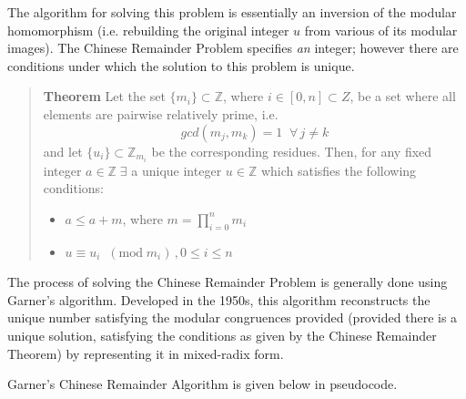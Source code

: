 \documentclass[letterpaper,12pt,titlepage,oneside,final]{book}
\newenvironment{theorem}{\begin{quote}%
  \textbf{Theorem }%
  \quad
}{%
\end{quote}%
}
\begin{document}
The algorithm for solving this problem is essentially an inversion of the modular homomorphism (i.e. rebuilding the original integer ${u}$ from various of its modular images).  The Chinese Remainder Problem specifies \textit{an} integer; however there are conditions under which the solution to this problem is unique.   
\newpage
\begin{theorem}\label{Chinese Remainder Theorem}
  Let the set ${\{m_i\} \subset \mathbb{Z}}$, where ${i \in [0, n] \subset Z}$, be a set where all elements are pairwise relatively prime, i.e.
  \begin{equation*}
    gcd( m_j, m_k) = 1 \;\; \forall \, j \neq k
  \end{equation*}
  and let ${\{u_i\} \subset \mathbb{Z}_{m_i}}$ be the corresponding residues.  Then, for any fixed integer ${a \in \mathbb{Z} \; \exists}$ a unique integer ${u \in \mathbb{Z}}$ which satisfies the following conditions:
  \begin{itemize}
    \item ${a \leq a + m}$, where ${m = \prod_{i=0}^{n}m_i}$
    \item ${u \equiv u_i \;\; (\textrm{mod} \; m_i)\,, 0 \leq i \leq n}$
  \end{itemize}  
\end{theorem}

The process of solving the Chinese Remainder Problem is generally done using Garner's algorithm.  Developed in the 1950s, this algorithm reconstructs the unique number satisfying the modular congruences provided (provided there is a unique solution, satisfying the conditions as given by the Chinese Remainder Theorem) by representing it in mixed-radix form.  

Garner's Chinese Remainder Algorithm is given below in pseudocode.
\end{document}
